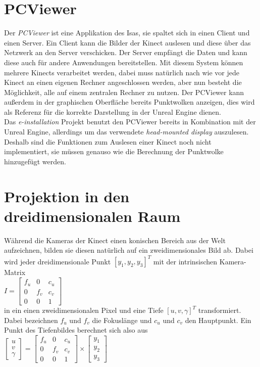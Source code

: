\documentclass[a4paper]{IEEEtran}
\begin{document}
\section{PCViewer}
	Der {\textit{PCViewer}} ist eine Applikation des Isas, sie spaltet sich in einen Client und einen Server. 
	Ein Client kann die Bilder der Kinect auslesen und diese über das Netzwerk an den Server verschicken. 
	Der Server empfängt die Daten und kann diese auch für andere Anwendungen bereitstellen.
	Mit diesem System können mehrere Kinects verarbeitet werden, dabei muss natürlich nach wie vor jede Kinect an einen eigenen Rechner angeschlossen werden, aber nun besteht die Möglichkeit, alle auf einem zentralen Rechner zu nutzen.
	Der PCViewer kann außerdem in der graphischen Oberfläche bereits Punktwolken anzeigen, dies wird als Referenz für die korrekte Darstellung in der Unreal Engine dienen. \\
	Das {\textit{e-installation}} Projekt benutzt den PCViewer bereits in Kombination mit der Unreal Engine, allerdings um das verwendete {\textit{head-mounted display}} auszulesen. 
	Deshalb sind die Funktionen zum Auslesen einer Kinect noch nicht implementiert, sie müssen genauso wie die Berechnung der Punktwolke hinzugefügt werden. \\

\section{Projektion in den dreidimensionalen Raum}
	Während die Kameras der Kinect einen konischen Bereich aus der Welt aufzeichnen, bilden sie diesen natürlich auf ein zweidimensionales Bild ab. 
	Dabei wird jeder dreidimensionale Punkt $[y_1,y_2,y_3]^T$ mit der intrinsischen Kamera-Matrix \\ [1cm]

$I = \begin{bmatrix}
f_u & 0 & c_u  \\
0 & f_v & c_v  \\
0 & 0 & 1  
\end{bmatrix}$\\[1cm]

	in ein einen zweidimensionalen Pixel und eine Tiefe $[u,v,\gamma]^T$ transformiert. 
	Dabei bezeichnen $f_u$ und $f_v$ die Fokuslänge und $c_u$ und $c_v$ den Hauptpunkt. 
	Ein Punkt des Tiefenbildes berechnet sich also aus \\[1cm]

$\begin{bmatrix}
u \\
v \\
\gamma
\end{bmatrix}
= \begin{bmatrix}
f_u & 0 & c_u  \\
0 & f_v & c_v  \\
0 & 0 & 1  
\end{bmatrix}
\times
\begin{bmatrix}
y_1 \\
y_2 \\
y_3
\end{bmatrix}$\\[1cm]
\end{document}

